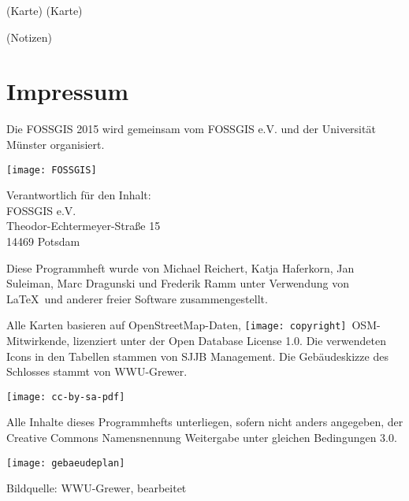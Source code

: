 \newpage
(Karte)
\label{karte}
\newpage
(Karte)
\newpage


\newpage
(Notizen)
\newpage

\section*{Impressum}
\label{impressum}
\vspace{-0.5em}


\begin{raggedright}
Die FOSSGIS 2015 wird gemeinsam vom FOSSGIS e.V. und der Universität Münster 
organisiert.

\vspace{0.5em}
	\texttt{[image: FOSSGIS]}

\vspace{0.5em}
\noindent Verantwortlich für den Inhalt:\\
FOSSGIS e.V.\\
Theodor-Echtermeyer-Straße 15\\
14469 Potsdam

\vspace{1em}
\noindent Diese Programmheft wurde von Michael Reichert, Katja Haferkorn, 
Jan Suleiman, Marc Dragunski und Frederik Ramm unter Verwendung von \LaTeX\ und anderer freier Software zusammengestellt. 

\vspace{0.5em}

\noindent Alle Karten basieren auf Open\-Street\-Map-Daten, 
\texttt{[image: copyright]}~OSM-Mitwirkende, lizenziert unter der Open Database License 1.0.
Die verwendeten Icons in den Tabellen stammen von SJJB Management. Die Gebäudeskizze des Schlosses stammt von WWU-Grewer.



\vspace{1em}
\noindent \begin{minipage}[htbp]{0.2\textwidth}
\noindent\texttt{[image: cc-by-sa-pdf]}
\end{minipage}
\hfill
\begin{minipage}[hbtp]{0.74\textwidth}\raggedright
Alle Inhalte dieses Programmhefts unterliegen, sofern nicht anders angegeben, 
der Creative Commons Namensnennung Weitergabe unter gleichen Bedingungen 3.0.
\end{minipage}
\end{raggedright}



\begin{landscape}
	\label{gebaeudeplan}
	\texttt{[image: gebaeudeplan]}
	
	Bildquelle: WWU-Grewer, bearbeitet
\end{landscape}

